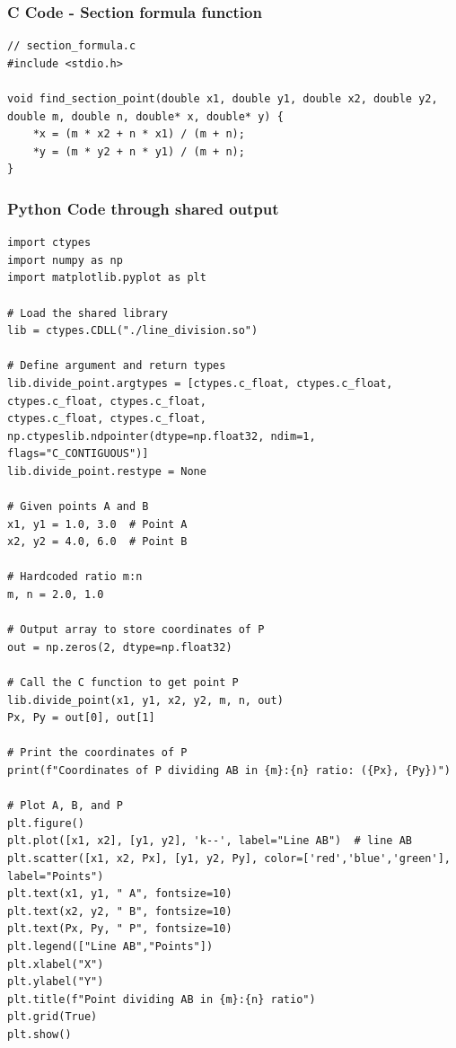 \documentclass{beamer}
\begin{document}
	\begin{frame}[fragile]
		\frametitle{C Code - Section formula function }
		
		\begin{lstlisting}
// section_formula.c
#include <stdio.h>

void find_section_point(double x1, double y1, double x2, double y2, double m, double n, double* x, double* y) {
	*x = (m * x2 + n * x1) / (m + n);
	*y = (m * y2 + n * y1) / (m + n);
}
			\end{lstlisting}
		\end{frame}


\begin{frame}[fragile]
	\frametitle{Python Code through shared output}
	\begin{lstlisting}
import ctypes
import numpy as np
import matplotlib.pyplot as plt

# Load the shared library
lib = ctypes.CDLL("./line_division.so")

# Define argument and return types
lib.divide_point.argtypes = [ctypes.c_float, ctypes.c_float, ctypes.c_float, ctypes.c_float,
ctypes.c_float, ctypes.c_float,
np.ctypeslib.ndpointer(dtype=np.float32, ndim=1, flags="C_CONTIGUOUS")]
lib.divide_point.restype = None

# Given points A and B
x1, y1 = 1.0, 3.0  # Point A
x2, y2 = 4.0, 6.0  # Point B

# Hardcoded ratio m:n
m, n = 2.0, 1.0

# Output array to store coordinates of P
out = np.zeros(2, dtype=np.float32)

# Call the C function to get point P
lib.divide_point(x1, y1, x2, y2, m, n, out)
Px, Py = out[0], out[1]

# Print the coordinates of P
print(f"Coordinates of P dividing AB in {m}:{n} ratio: ({Px}, {Py})")

# Plot A, B, and P
plt.figure()
plt.plot([x1, x2], [y1, y2], 'k--', label="Line AB")  # line AB
plt.scatter([x1, x2, Px], [y1, y2, Py], color=['red','blue','green'], label="Points")
plt.text(x1, y1, " A", fontsize=10)
plt.text(x2, y2, " B", fontsize=10)
plt.text(Px, Py, " P", fontsize=10)
plt.legend(["Line AB","Points"])
plt.xlabel("X")
plt.ylabel("Y")
plt.title(f"Point dividing AB in {m}:{n} ratio")
plt.grid(True)
plt.show()
	\end{lstlisting}
\end{frame}
\end{document}
